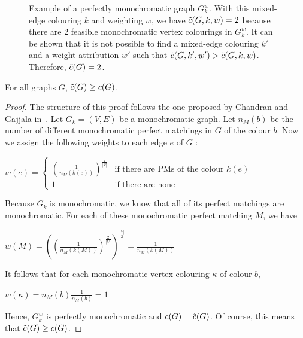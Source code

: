 \begin{figure}[H]
    \caption{Example of a perfectly monochromatic graph $G_k^w$.
        With this mixed-edge colouring $k$ and weighting $w$, we have $\Tilde{c}(G, k, w) = 2$ because there are 2 feasible monochromatic vertex colourings in $G_k^w$.
        It can be shown that it is not possible to find a mixed-edge colouring $k'$ and a weight attribution $w'$ such that $\Tilde{c}(G, k', w') > \Tilde{c}(G, k, w)$.
        Therefore, $\Tilde{c}(G) = 2$.}
    \label{fig:perfectly_mono}
\end{figure}

\begin{observation}
    \label{obs:c_tilde_greater_than_c}
    For all graphs $G$, $\Tilde{c}(G) \geq c(G)$.
\end{observation}

\begin{proof}
    The structure of this proof follows the one proposed by Chandran and Gajjala in~\cite{chandran}.
    Let $G_k = (V, E)$ be a monochromatic graph.
    Let $n_{M}(b)$ be the number of different monochromatic perfect matchings in $G$ of the colour $b$.
    Now we assign the following weights to each edge $e$ of $G$ :
    
    \begin{center}
        $w(e) = \left\{
        \begin{array}{ll}
            \left(\frac{1}{n_{M}(k(e))}\right)^{\frac{2}{|V|}} & \mbox{if there are PMs of the colour } k(e) \\
            1 & \mbox{if there are none}
        \end{array}
        \right.$
    \end{center}

    Because $G_k$ is monochromatic, we know that all of its perfect matchings are monochromatic.
    For each of these monochromatic perfect matching $M$, we have
    
    \begin{center}
        $w(M) = \left( (\frac{1}{n_{M}(k(M))})^{\frac{2}{|V|}}\right)^{\frac{|V|}{2}} = \frac{1}{n_{M}(k(M))}$
    \end{center}
    
    It follows that for each monochromatic vertex colouring $\kappa$ of colour $b$,
    
    \begin{center}
        $w(\kappa) = n_{M}(b)\frac{1}{n_{M}(b)} = 1$
    \end{center}
    
    Hence, $G_k^w$ is perfectly monochromatic and $c(G) = \Tilde{c}(G)$.
    Of course, this means that $\Tilde{c}(G) \geq c(G)$.
\end{proof}

